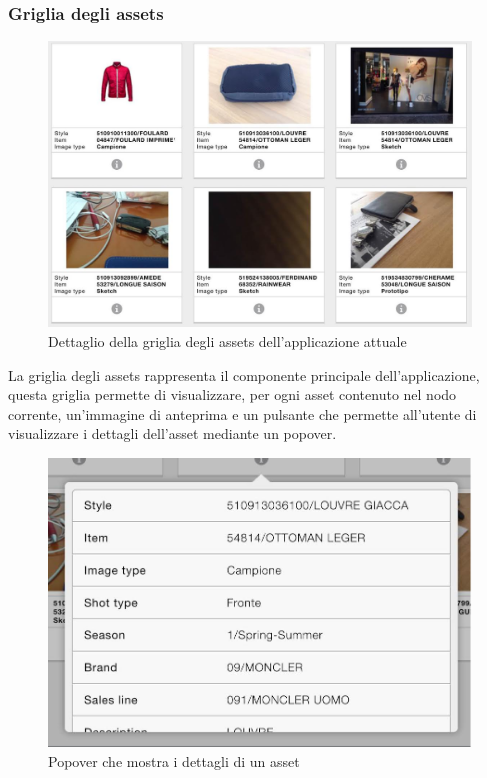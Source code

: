 \FloatBarrier
\subsubsection{Griglia degli assets}

\begin{figure}[htbp]
\centering
\includegraphics[width=\textwidth]{../immagini/warda-gallery-griglia}
\caption{Dettaglio della griglia degli assets dell'applicazione attuale}  
\end{figure}

La griglia degli assets rappresenta il componente principale dell'applicazione, questa griglia permette di visualizzare, per ogni asset contenuto nel nodo corrente, un'immagine di anteprima e un pulsante che permette all'utente di visualizzare i dettagli dell'asset mediante un \gls{popover}.

\begin{figure}[htbp]
\centering
\includegraphics[scale=0.25]{../immagini/warda-gallery-dettaglio}
\caption{Popover che mostra i dettagli di un asset}  
\end{figure}

